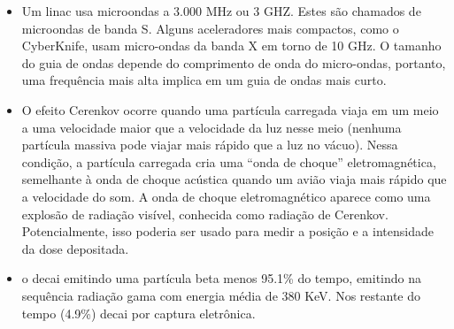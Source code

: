 \documentclass[11pt,a4paper]{article}
\begin{document}
\begin{itemize}
    \item Um linac usa microondas a 3.000 MHz ou 3 GHZ. Estes são chamados de microondas de banda S. Alguns aceleradores mais compactos, como o CyberKnife, usam micro-ondas da banda X em torno de 10 GHz. O tamanho do guia de ondas depende do comprimento de onda do micro-ondas, portanto, uma frequência mais alta implica em um guia de ondas mais curto.
    
    \item O efeito Cerenkov ocorre quando uma partícula carregada viaja em um meio a uma velocidade maior que a velocidade da luz nesse meio (nenhuma partícula massiva pode viajar mais rápido que a luz no vácuo). Nessa condição, a partícula carregada cria uma “onda de choque” eletromagnética, semelhante à onda de choque acústica quando um avião viaja mais rápido que a velocidade do som. A onda de choque eletromagnético aparece como uma explosão de radiação visível, conhecida como radiação de Cerenkov. Potencialmente, isso poderia ser usado para medir a posição e a intensidade da dose depositada.
    
    \item o  decai emitindo uma partícula beta menos 95.1\% do tempo, emitindo na sequência radiação gama com energia média de 380 KeV. Nos restante do tempo (4.9\%) decai por captura eletrônica.
\end{itemize}



\end{document}
